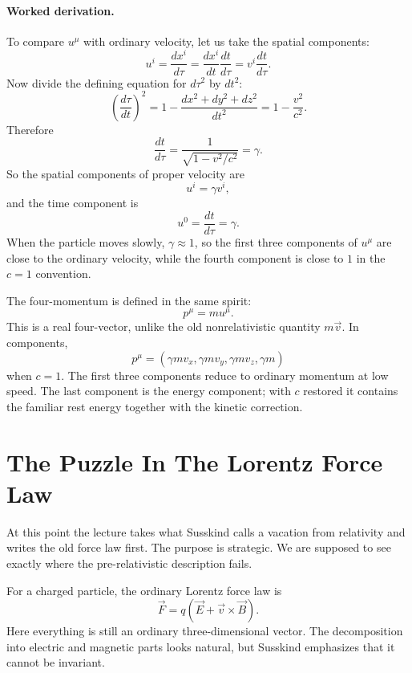 \paragraph{Worked derivation.}
To compare \(u^\mu\) with ordinary velocity, let us take the spatial components:
\begin{equation}
u^i=\frac{dx^i}{d\tau}
=
\frac{dx^i}{dt}\frac{dt}{d\tau}
=
v^i\frac{dt}{d\tau}.
\end{equation}
Now divide the defining equation for \(d\tau^2\) by \(dt^2\):
\begin{equation}
\left(\frac{d\tau}{dt}\right)^2
=
1-\frac{dx^2+dy^2+dz^2}{dt^2}
=
1-\frac{v^2}{c^2}.
\end{equation}
Therefore
\begin{equation}
\frac{dt}{d\tau}
=
\frac{1}{\sqrt{1-v^2/c^2}}
=
\gamma.
\end{equation}
So the spatial components of proper velocity are
\begin{equation}
u^i=\gamma v^i,
\end{equation}
and the time component is
\begin{equation}
u^0=\frac{dt}{d\tau}=\gamma.
\end{equation}
When the particle moves slowly, \(\gamma\approx 1\), so the first three components of \(u^\mu\) are close to the ordinary velocity, while the fourth component is close to \(1\) in the \(c=1\) convention.

The four-momentum is defined in the same spirit:
\begin{equation}
p^\mu=mu^\mu.
\end{equation}
This is a real four-vector, unlike the old nonrelativistic quantity \(m\vec v\). In components,
\[
p^\mu=(\gamma mv_x,\gamma mv_y,\gamma mv_z,\gamma m)
\]
when \(c=1\). The first three components reduce to ordinary momentum at low speed. The last component is the energy component; with \(c\) restored it contains the familiar rest energy together with the kinetic correction.

\section{The Puzzle In The Lorentz Force Law}

At this point the lecture takes what Susskind calls a vacation from relativity and writes the old force law first. The purpose is strategic. We are supposed to see exactly where the pre-relativistic description fails.

For a charged particle, the ordinary Lorentz force law is
\begin{equation}
\vec F=q\left(\vec E+\vec v\times \vec B\right).
\end{equation}
Here everything is still an ordinary three-dimensional vector. The decomposition into electric and magnetic parts looks natural, but Susskind emphasizes that it cannot be invariant.

